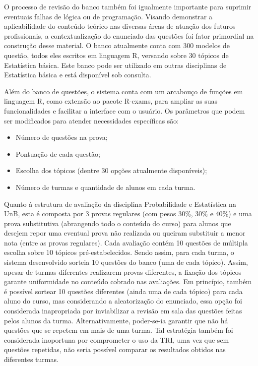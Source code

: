 \documentclass[a4paper]{report}
\providecommand{\tightlist}{%
  \setlength{\itemsep}{0pt}\setlength{\parskip}{0pt}}
\begin{document}
O processo de revisão do banco também foi igualmente importante para
suprimir eventuais falhas de lógica ou de programação. Visando
demonstrar a aplicabilidade do conteúdo teórico nas diversas áreas de
atuação dos futuros profissionais, a contextualização do enunciado das
questões foi fator primordial na construção desse material. O banco
atualmente conta com 300 modelos de questão, todos eles escritos em
linguagem R, versando sobre 30 tópicos de Estatística básica. Este banco
pode ser utilizado em outras disciplinas de Estatística básica e está
disponível sob consulta.

Além do banco de questões, o sistema conta com um arcabouço de funções
em linguagem R, como extensão ao pacote R-exams, para ampliar as suas
funcionalidades e facilitar a interface com o usuário. Os parâmetros que
podem ser modificados para atender necessidades específicas são:

\begin{itemize}
\tightlist
\item
  Número de questões na prova;
\item
  Pontuação de cada questão;
\item
  Escolha dos tópicos (dentre 30 opções atualmente disponíveis);
\item
  Número de turmas e quantidade de alunos em cada turma.
\end{itemize}

Quanto à estrutura de avaliação da disciplina Probabilidade e
Estatística na UnB, esta é composta por 3 provas regulares (com pesos
30\%, 30\% e 40\%) e uma prova substitutiva (abrangendo todo o conteúdo
do curso) para alunos que desejem repor uma eventual prova não realizada
ou queiram substituir a menor nota (entre as provas regulares). Cada
avaliação contém 10 questões de múltipla escolha sobre 10 tópicos
pré-estabelecidos. Sendo assim, para cada turma, o sistema desenvolvido
sorteia 10 questões do banco (uma de cada tópico). Assim, apesar de
turmas diferentes realizarem provas diferentes, a fixação dos tópicos
garante uniformidade no conteúdo cobrado nas avaliações. Em princípio,
também é possível sortear 10 questões diferentes (ainda uma de cada
tópico) para cada aluno do curso, mas considerando a aleatorização do
enunciado, essa opção foi considerada inapropriada por inviabilizar a
revisão em sala das questões feitas pelos alunos da turma.
Alternativamente, poder-se-ia garantir que não há questões que se
repetem em mais de uma turma. Tal estratégia também foi considerada
inoportuna por comprometer o uso da TRI, uma vez que sem questões
repetidas, não seria possível comparar os resultados obtidos nas
diferentes turmas.
\end{document}
